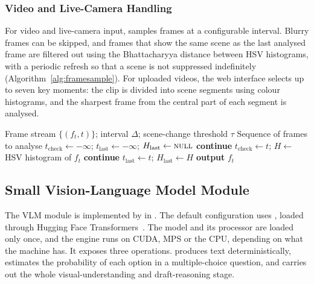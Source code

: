 \subsubsection{Video and Live-Camera Handling}
For video and live-camera input,  samples frames at a configurable interval. Blurry frames can be skipped, and frames that show the same scene as the last analysed frame are filtered out using the Bhattacharyya distance between HSV histograms, with a periodic refresh so that a scene is not suppressed indefinitely (Algorithm~\ref{alg:framesample}). For uploaded videos, the web interface selects up to seven key moments: the clip is divided into scene segments using colour histograms, and the sharpest frame from the central part of each segment is analysed.

\begin{algorithm}[H]
\caption{Frame Sampling for Video and Live Camera}
\label{alg:framesample}
\begin{algorithmic}[1]
\Require Frame stream $\{(f_t, t)\}$; interval $\Delta$; scene-change threshold $\tau$
\Ensure Sequence of frames to analyse
\State $t_{\text{check}} \gets -\infty$;\; $t_{\text{last}} \gets -\infty$;\; $H_{\text{last}} \gets \textsc{null}$
    \State \textbf{continue}
  \EndIf
  \State $t_{\text{check}} \gets t$;\; $H \gets$ HSV histogram of $f_t$
    \State \textbf{continue} 
  \EndIf
  \State $t_{\text{last}} \gets t$;\; $H_{\text{last}} \gets H$
  \State \textbf{output} $f_t$
\EndFor
\end{algorithmic}
\end{algorithm}

\subsection{Small Vision-Language Model Module}
\label{sec:vlm}

The VLM module is implemented by  in . The default configuration uses , loaded through Hugging Face Transformers~\cite{wolf2020transformers}. The model and its processor are loaded only once, and the engine runs on CUDA, MPS or the CPU, depending on what the machine has. It exposes three operations.  produces text deterministically,  estimates the probability of each option in a multiple-choice question, and  carries out the whole visual-understanding and draft-reasoning stage.

